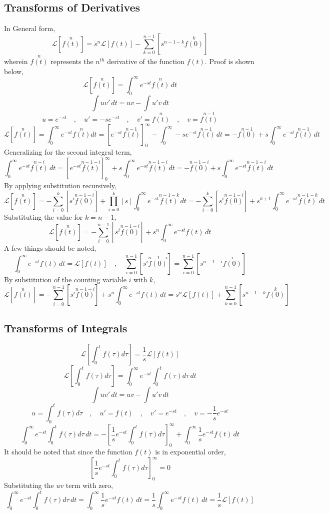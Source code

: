 \documentclass[a4paper, 12pt]{report}
\def\f{\frac}
\def\l{\left}
\def\r{\right}
\def\lap{\mathcal{L}}
\begin{document}
\begin{center}
\subsection{Transforms of Derivatives}
In General form,
$$\lap[\overset{n}{f(t)}] = s^n\lap[f(t)] - \sum^{n - 1}_{k = 0}\l[s^{n - 1 - k}\overset{k}{f(0)}\r]$$
wherein $\overset{n}{f(t)}$ represents the $n^{th}$ derivative of the function $f(t)$. Proof is shown below,
$$\lap[\overset{n}{f(t)}] = \int^{\infty}_{0}e^{-st}\overset{n}{f(t)}\,dt$$
$$\int uv' \,dt = uv - \int u'v \,dt$$
$$u = e^{-st}\quad,\quad u' = -se^{-st} \quad,\quad v' = \overset{n}{f(t)} \quad,\quad v = \overset{n-1}{f(t)}$$
$$\lap[\overset{n}{f(t)}] = \int^{\infty}_{0}e^{-st}\overset{n}{f(t)}dt = \l[e^{-st}\overset{n-1}{f(t)}\r]^{\infty}_{0} - \int^{\infty}_{0}-se^{-st}\overset{n-1}{f(t)} \,dt = -\overset{n-1}{f(0)} + s\int^{\infty}_{0}e^{-st}\overset{n-1}{f(t)} \,dt $$
Generalizing for the second integral term,
$$\int^{\infty}_{0}e^{-st}\overset{n-i}{f(t)} \,dt = \l[e^{-st}\overset{n-1-i}{f(t)}\r]^{\infty}_{0} + s\int^{\infty}_{0}e^{-st}\overset{n-1-i}{f(t)} \,dt = -\overset{n-1-i}{f(0)} + s\int^{\infty}_{0}e^{-st}\overset{n-1-i}{f(t)} \,dt$$
By applying substitution recursively,
$$\lap[\overset{n}{f(t)}] = -\sum^{k}_{i = 0}\l[s^i\overset{n-1-i}{f(0)}\r] + \prod^{k}_{i = 0}\l[s\r]\int^{\infty}_{0}e^{-st}\overset{n-1-k}{f(t)} \,dt = -\sum^{k}_{i = 0}\l[s^i\overset{n-1-i}{f(0)}\r] + s^{k + 1}\int^{\infty}_{0}e^{-st}\overset{n-1-k}{f(t)} \,dt$$
Substituting the value for $k = n-1$,
$$\lap[\overset{n}{f(t)}] = -\sum^{n-1}_{i = 0}\l[s^i\overset{n-1-i}{f(0)}\r] + s^{n}\int^{\infty}_{0}e^{-st}f(t) \,dt$$
A few things should be noted,
$$\int^{\infty}_{0}e^{-st}f(t) \,dt = \lap[f(t)]\quad,\quad \sum^{n-1}_{i = 0}\l[s^i\overset{n-1-i}{f(0)}\r] = \sum^{n-1}_{i = 0}\l[s^{n-1-i}\overset{i}{f(0)}\r]$$
By substitution of the counting variable $i$ with $k$,
$$\lap[\overset{n}{f(t)}] = -\sum^{n-1}_{i = 0}\l[s^i\overset{n-1-i}{f(0)}\r] + s^{n}\int^{\infty}_{0}e^{-st}f(t) \,dt = s^n \lap[f(t)] + \sum^{n-1}_{k = 0}\l[s^{n-1-k}\overset{k}{f(0)}\r]$$
\subsection{Transforms of Integrals}
$$\lap\l[\int^{t}_{0}f(\tau)d\tau\r] = \f{1}{s}\lap[f(t)]$$
$$\lap\l[\int^{t}_{0}f(\tau)d\tau\r] = \int^{\infty}_{0}e^{-st}\int^{t}_{0}f(\tau)d\tau\,dt$$
$$\int uv' \,dt = uv - \int u'v \,dt$$
$$u = \int^{t}_{0}f(\tau)d\tau \quad,\quad u' = f(t) \quad,\quad v' = e^{-st} \quad,\quad v = -\f{1}{s}e^{-st}$$
$$\int^{\infty}_{0}e^{-st}\int^{t}_{0}f(\tau)d\tau\,dt = -\l[\f{1}{s}e^{-st}\int^{t}_{0}f(\tau)d\tau\r]^{\infty}_{0} + \int^{\infty}_{0}\f{1}{s}e^{-st}f(t)\,dt$$
It should be noted that since the function $f(t)$ is in exponential order,
$$\l[\f{1}{s}e^{-st}\int^{t}_{0}f(\tau)d\tau\r]^{\infty}_{0} = 0$$
Substituting the $uv$ term with zero,
$$\int^{\infty}_{0}e^{-st}\int^{t}_{0}f(\tau)d\tau\,dt = \int^{\infty}_{0}\f{1}{s}e^{-st}f(t)\,dt = \f{1}{s}\int^{\infty}_{0}e^{-st}f(t)\,dt = \f{1}{s}\lap[f(t)]$$

\end{center}
\end{document}
